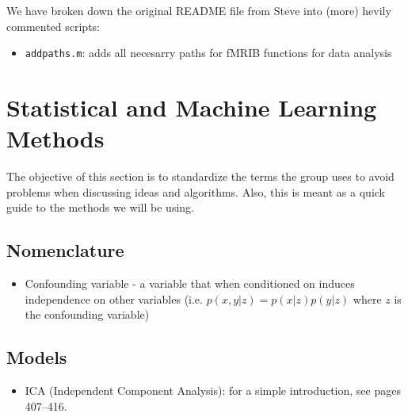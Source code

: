 \documentclass{article}
\begin{document}
We have broken down the original README file from Steve into (more) hevily commented scripts:
\begin{itemize}
\item {\tt addpaths.m}: adds all necesarry paths for fMRIB functions for data analysis
\end{itemize}


\section{Statistical and Machine Learning Methods\label{sec:methods}}

The objective of this section is to standardize the terms the group uses to avoid problems when discussing ideas and algorithms. Also, this is meant as a quick guide to the methods we will be using.

\subsection{Nomenclature\label{sec:method-nomen}}
\begin{itemize}
\item Confounding variable - a variable that when conditioned on induces independence on other variables (i.e. $p(x,y|z) = p(x|z)p(y|z)$ where $z$ is the confounding variable)
\end{itemize}


\subsection{Models\label{models}}
\begin{itemize}
\item ICA (Independent Component Analysis): for a simple introduction, see \cite{Murphy2012} pages 407--416.
\end{itemize}



\end{document}
